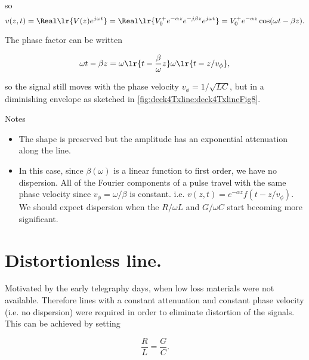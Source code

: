 so
\begin{dmath}\label{eqn:uwaves4TransmissionLines:720}
v(z, t)
= \Real \lr{ V(z) e^{j \omega t} }
= \Real \lr{ V_0^{+} e^{-\alpha z} e^{-j \beta z} e^{j \omega t} }
= V_0^{+} e^{-\alpha z} \cos( \omega t - \beta z ).
\end{dmath}

The phase factor can be written

\begin{dmath}\label{eqn:uwaves4TransmissionLines:740}
\omega t - \beta z
=
\omega \lr{ t - \frac{\beta}{\omega} z }
\omega \lr{ t - z/v_\phi },
\end{dmath}

so the signal still moves with the phase velocity \( v_\phi = 1/\sqrt{LC} \), but in a diminishing envelope as sketched in \cref{fig:deck4Txline:deck4TxlineFig8}.


Notes

\begin{itemize}
\item The shape is preserved but the amplitude has an exponential attenuation along the line.
\item In this case, since \( \beta(\omega) \) is a linear function to first order, we have no dispersion.  All of the Fourier components of a pulse travel with the same phase velocity since \( v_\phi = \omega/\beta \) is constant.  i.e.  \( v(z, t) = e^{-\alpha z} f( t - z/v_\phi ) \).  We should expect dispersion when the \( R/\omega L \) and \( G/\omega C \) start becoming more significant.
\end{itemize}

\section{Distortionless line.}

Motivated by the early telegraphy days, when low loss materials were not available.  Therefore lines with a constant attenuation and constant phase velocity (i.e. no dispersion) were required in order to eliminate distortion of the signals.  This can be achieved by setting

\begin{equation}\label{eqn:uwaves4TransmissionLines:760}
\frac{R}{L} = \frac{G}{C}.
\end{equation}

